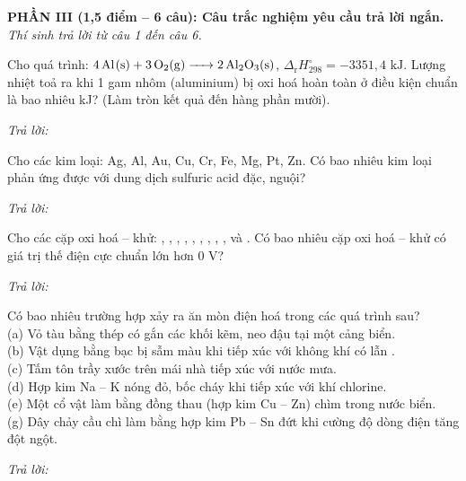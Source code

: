 \documentclass[11pt,a4paper]{article}
\def\loigiai#1{}
\begin{document}
\noindent
\textbf{PHẦN III (1,5 điểm -- 6 câu): Câu trắc nghiệm yêu cầu trả lời ngắn.}\\
\textit{Thí sinh trả lời từ câu 1 đến câu 6.}

\setcounter{ex}{0}

\begin{ex}
Cho quá trình: $\ce{4Al(s) + 3O2(g) -> 2Al2O3(s)}$, $\Delta_{\text{r}} H^\circ_{298} = -3351{,}4\text{ kJ}$. Lượng nhiệt toả ra khi 1 gam nhôm (aluminium) bị oxi hoá hoàn toàn ở điều kiện chuẩn là bao nhiêu kJ? (Làm tròn kết quả đến hàng phần mười).
\par\noindent\textit{Trả lời:} \dotfill
\loigiai{}
\end{ex}

\begin{ex}
Cho các kim loại: Ag, Al, Au, Cu, Cr, Fe, Mg, Pt, Zn. Có bao nhiêu kim loại phản ứng được với dung dịch sulfuric acid đặc, nguội?
\par\noindent\textit{Trả lời:} \dotfill
\loigiai{}
\end{ex}

\begin{ex}
Cho các cặp oxi hoá -- khử: , , , , , , , , ,  và . Có bao nhiêu cặp oxi hoá -- khử có giá trị thế điện cực chuẩn lớn hơn 0 V?
\par\noindent\textit{Trả lời:} \dotfill
\loigiai{}
\end{ex}

\begin{ex}
Có bao nhiêu trường hợp xảy ra ăn mòn điện hoá trong các quá trình sau?\\
(a) Vỏ tàu bằng thép có gắn các khối kẽm, neo đậu tại một cảng biển.\\
(b) Vật dụng bằng bạc bị sẫm màu khi tiếp xúc với không khí có lẫn .\\
(c) Tấm tôn trầy xước trên mái nhà tiếp xúc với nước mưa.\\
(d) Hợp kim Na -- K nóng đỏ, bốc cháy khi tiếp xúc với khí chlorine.\\
(e) Một cổ vật làm bằng đồng thau (hợp kim Cu -- Zn) chìm trong nước biển.\\
(g) Dây chảy cầu chì làm bằng hợp kim Pb -- Sn đứt khi cường độ dòng điện tăng đột ngột.
\par\noindent\textit{Trả lời:} \dotfill
\loigiai{}
\end{ex}
\end{document}
